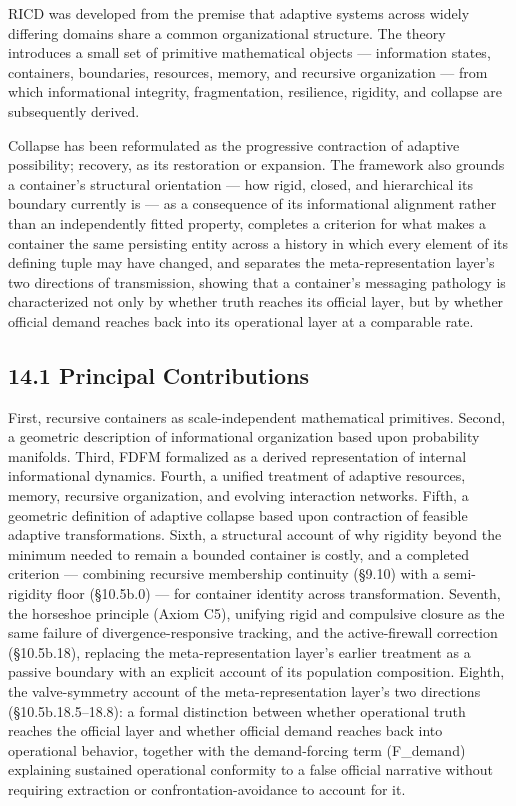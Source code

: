 \documentclass[
]{article}
\begin{document}
RICD was developed from the premise that adaptive systems across widely
differing domains share a common organizational structure. The theory
introduces a small set of primitive mathematical objects --- information
states, containers, boundaries, resources, memory, and recursive
organization --- from which informational integrity, fragmentation,
resilience, rigidity, and collapse are subsequently derived.

Collapse has been reformulated as the progressive contraction of
adaptive possibility; recovery, as its restoration or expansion. The
framework also grounds a container's structural orientation --- how
rigid, closed, and hierarchical its boundary currently is --- as a
consequence of its informational alignment rather than an independently
fitted property, completes a criterion for what makes a container the
same persisting entity across a history in which every element of its
defining tuple may have changed, and separates the meta-representation
layer's two directions of transmission, showing that a container's
messaging pathology is characterized not only by whether truth reaches
its official layer, but by whether official demand reaches back into its
operational layer at a comparable rate.

\hypertarget{principal-contributions}{%
\subsection{14.1 Principal
Contributions}\label{principal-contributions}}

First, recursive containers as scale-independent mathematical
primitives. Second, a geometric description of informational
organization based upon probability manifolds. Third, FDFM formalized as
a derived representation of internal informational dynamics. Fourth, a
unified treatment of adaptive resources, memory, recursive organization,
and evolving interaction networks. Fifth, a geometric definition of
adaptive collapse based upon contraction of feasible adaptive
transformations. Sixth, a structural account of why rigidity beyond the
minimum needed to remain a bounded container is costly, and a completed
criterion --- combining recursive membership continuity (§9.10) with a
semi-rigidity floor (§10.5b.0) --- for container identity across
transformation. Seventh, the horseshoe principle (Axiom C5), unifying
rigid and compulsive closure as the same failure of
divergence-responsive tracking, and the active-firewall correction
(§10.5b.18), replacing the meta-representation layer's earlier treatment
as a passive boundary with an explicit account of its population
composition. Eighth, the valve-symmetry account of the
meta-representation layer's two directions (§10.5b.18.5--18.8): a formal
distinction between whether operational truth reaches the official layer
and whether official demand reaches back into operational behavior,
together with the demand-forcing term (F\_demand) explaining sustained
operational conformity to a false official narrative without requiring
extraction or confrontation-avoidance to account for it.
\end{document}

